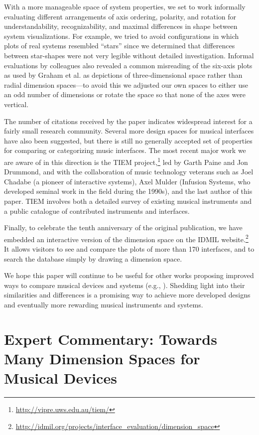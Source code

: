 {{With a more manageable space of system properties, we set to work informally evaluating different arrangements of axis ordering, polarity, and rotation for understandability, recognizability, and maximal differences in shape between system visualizations. For example, we tried to avoid configurations in which plots of real systems resembled ``stars'' since we determined that differences between star-shapes were not very legible without detailed investigation. Informal evaluations by colleagues also revealed a common misreading of the six-axis plots as used by Graham et al. as depictions of three-dimensional space rather than radial dimension spaces---to avoid this we adjusted our own spaces to either use an odd number of dimensions or rotate the space so that none of the axes were vertical.

The number of citations received by the paper indicates widespread interest for a fairly small research community. Several more design spaces for musical interfaces have also been suggested, but there is still no generally accepted set of properties for comparing or categorizing music interfaces. The most recent major work we are aware of in this direction is the TIEM project,\footnote{\url{http://vipre.uws.edu.au/tiem/}} led by Garth Paine and Jon Drummond, and with the collaboration of music technology veterans such as Joel Chadabe (a pioneer of interactive systems), Axel Mulder (Infusion Systems, who developed seminal work in the field during the 1990s), and the last author of this paper. TIEM involves both a detailed survey of existing musical instruments and a public catalogue of contributed instruments and interfaces.

Finally, to celebrate the tenth anniversary of the original publication, we have embedded an interactive version of the dimension space on the IDMIL website.\footnote{\url{http://idmil.org/projects/interface_evaluation/dimension_space}} It allows visitors to see and compare the plots of more than 170 interfaces, and to search the database simply by drawing a dimension space.

We hope this paper will continue to be useful for other works proposing improved ways to compare musical devices and systems (e.g., \cite{Morreale:2014,Malloch:2006}). Shedding light into their similarities and differences is a promising way to achieve more developed designs and eventually more rewarding musical instruments and systems.


\section*{Expert Commentary: Towards Many Dimension Spaces for Musical Devices}

}}

